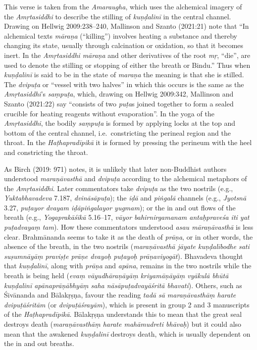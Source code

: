 \begin{ekdosis}
\begin{philcomm}[hp03_012]
This verse is taken from the \emph{Amaraugha}, which uses the alchemical imagery of the \emph{Amṛtasiddhi} to describe the stilling of \emph{kuṇḍalinī} in the central channel. Drawing on Hellwig 2009:238–240, Mallinson and Szanto (2021:21) note that “In alchemical texts \emph{māraṇa} (“killing”) involves heating a substance and thereby changing its state, usually through calcination or oxidation, so that it becomes inert. In the \emph{Amṛtasiddhi māraṇa} and other derivatives of the root \emph{mṛ}, “die”, are used to denote the stilling or stopping of either the breath or Bindu.” Thus when \emph{kuṇḍalinī} is said to be in the state of \emph{maraṇa} the meaning is that she is stilled. The \emph{dvipuṭa} or “vessel with two halves” in which this occurs is the same as the \emph{Amṛtasiddhi}’s \emph{saṃpuṭa}, which, drawing on Hellwig 2009:342, Mallinson and Szanto (2021:22) say “consists of two \emph{puṭa}s joined together to form a sealed crucible for heating reagents without evaporation”. In the yoga of the \emph{Amṛtasiddhi}, the bodily \emph{saṃpuṭa} is formed by applying locks at the top and bottom of the central channel, i.e.~constricting the perineal region and the throat. In the \emph{Haṭhapradīpikā} it is formed by pressing the perineum with the heel and constricting the throat.

As Birch (2019: 971) notes, it is unlikely that later non-Buddhist authors understood \textit{maraṇāvasthā} and \emph{dvipuṭa} according to the alchemical metaphors of the \textit{Amṛtasiddhi}. Later commentators take \emph{dvipuṭa} as the two nostrils (e.g., \textit{Yuktabhavadeva} 7.187, \textit{dvināsāpuṭa}); the \textit{iḍā} and \textit{piṅgalā} channels (e.g., \textit{Jyotsnā} 3.27, \textit{puṭayor dvayam iḍāpiṅgalayor yugmam}); or the in and out flows of the breath (e.g., \textit{Yogaprakāśikā} 5.16–17, \textit{vāyor bahirnirgamanam antaḥpraveśa iti yat puṭadvayaṃ tam}). How these commentators understood \textit{asau māraṇāvasthā} is less clear. Brahmānanda seems to take it as the death of \textit{prāṇa}, or in other words, the absence of the breath, in the two nostrils (\textit{maraṇāvasthā jāyate kuṇḍalībodhe sati suṣumnāyāṃ praviṣṭe prāṇe dvayoḥ puṭayoḥ prāṇaviyogāt}).  Bhavadeva thought that \emph{kuṇḍalinī}, along with \textit{prāṇa} and \textit{apāna}, remains in the two nostrils while the breath is being held (\textit{evaṃ vāyudhāraṇāyāṃ kriyamāṇāyāṃ vyākulā bhūtā kuṇḍalinī apānaprāṇābhyāṃ saha nāsāpuṭadvayāśritā bhavati}). Others, such as Śivānanda and Bālakṛṣṇa, favour the reading \textit{tadā sā maraṇāvasthāṃ harate dvipuṭāśritām} (or \textit{dvipuṭāśrayām}), which is present in group 2 and 3 manuscripts of the \textit{Haṭhapradīpikā}. Bālakṛṣṇa understands this to mean that the great seal destroys death (\textit{maraṇāvasthāṃ harate mahāmudreti bhāvaḥ}) but it could also mean that the awakened \emph{kuṇḍalinī} destroys death, which is usually dependent on the in and out breaths.


\end{philcomm}
\end{ekdosis}
